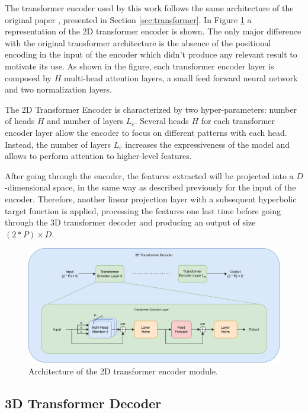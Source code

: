 \documentclass[binding=0.6cm,noexaminfo]{sapthesis}
\begin{document}
The transformer encoder used by this work follows the same architecture of the original paper \cite{attention-is-all-you-need}, presented in Section \ref{sec:transformer}. In Figure \ref{fig:t-enc} a representation of the 2D transformer encoder is shown. The only major difference with the original transformer architecture is the absence of the positional encoding in the input of the encoder which didn't produce any relevant result to motivate its use. As shown in the figure, each transformer encoder layer is composed by $H$ multi-head attention layers, a small feed forward neural network and two normalization layers.

The 2D Transformer Encoder is characterized by two hyper-parameters: number of heads $H$ and number of layers $L_e$. Several heads $H$ for each transformer encoder layer allow the encoder to focus on different patterns with each head. Instead, the number of layers $L_e$ increases the expressiveness of the model and allows to perform attention to higher-level features.

After going through the encoder, the features extracted will be projected into a $D$-dimensional space, in the same way as described previously for the input of the encoder. Therefore, another linear projection layer with a subsequent hyperbolic target function is applied, processing the features one last time before going through the 3D transformer decoder and producing an output of size $(2 * P) \times D$.

\begin{figure}[h!]
\centering
\includegraphics[width=\linewidth]{2d-trans-encoder}
\caption{Architecture of the 2D transformer encoder module.}
\label{fig:t-enc}
\end{figure}

\subsection{3D Transformer Decoder}
\end{document}
